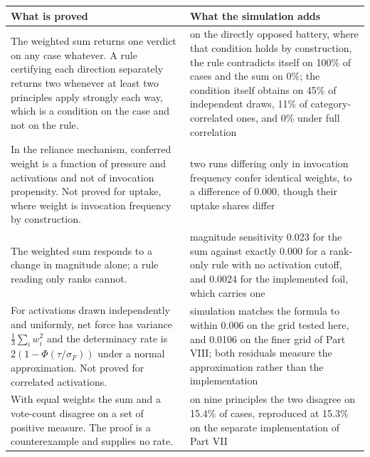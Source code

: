 \begin{tabular}{p{} p{}}
\toprule
\textbf{What is proved} & \textbf{What the simulation adds} \\
\midrule
The weighted sum returns one verdict on any case whatever. A rule certifying each direction separately returns two whenever at least two principles apply strongly each way, which is a condition on the case and not on the rule. & on the directly opposed battery, where that condition holds by construction, the rule contradicts itself on 100\% of cases and the sum on 0\%; the condition itself obtains on 45\% of independent draws, 11\% of category-correlated ones, and 0\% under full correlation \\
\addlinespace
In the reliance mechanism, conferred weight is a function of pressure and activations and not of invocation propensity. Not proved for uptake, where weight is invocation frequency by construction. & two runs differing only in invocation frequency confer identical weights, to a difference of 0.000, though their uptake shares differ \\
\addlinespace
The weighted sum responds to a change in magnitude alone; a rule reading only ranks cannot. & magnitude sensitivity 0.023 for the sum against exactly 0.000 for a rank-only rule with no activation cutoff, and 0.0024 for the implemented foil, which carries one \\
\addlinespace
For activations drawn independently and uniformly, net force has variance $\tfrac{1}{3}\sum_i w_i^2$ and the determinacy rate is $2(1-\Phi(\tau/\sigma_F))$ under a normal approximation. Not proved for correlated activations. & simulation matches the formula to within 0.006 on the grid tested here, and 0.0106 on the finer grid of Part VIII; both residuals measure the approximation rather than the implementation \\
\addlinespace
With equal weights the sum and a vote-count disagree on a set of positive measure. The proof is a counterexample and supplies no rate. & on nine principles the two disagree on 15.4\% of cases, reproduced at 15.3\% on the separate implementation of Part VII \\
\bottomrule
\end{tabular}
